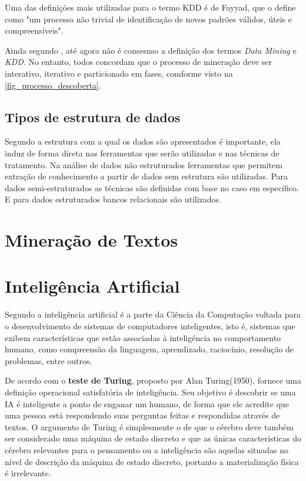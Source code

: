 \documentclass[
	12pt,				%
	openright,			%
	twoside,			%
	a4paper,			%
	english,			%
	french,				%
	spanish,			%
	brazil				%
	]{abntex2}
\begin{document}
Uma das definições mais utilizadas para o termo KDD é de Fayyad, que o define como "um processo não trivial de identificação de novos padrões válidos, úteis e compreensíveis".\cite[p.3]{camilo2009mineraccao}

Ainda segundo , até agora não é consesnso a definição dos termos \emph{Data Mining} e \emph{KDD}. No entanto, todos concordam que o processo de mineração deve ser interativo, iterativo e particionado em fases, comforme visto na \autoref{fig_processo_descoberta}. 

\subsection{Tipos de estrutura de dados}
Segundo  a estrutura com a qual os dados são apresentados é importante, ela induz de forma direta nas ferramentas que serão utilizadas e nas técnicas de tratamento. Na análise de dados  não estruturados ferramentas que permitem extração de conhecimento a partir de dados sem estrutura são utilizadas. Para dados semi-estruturados as técnicas são definidas  com base no caso em específico. E para dados estruturados bancos relacionais são utilizados.


\section{Mineração de Textos}

\section{Inteligência Artificial}
Segundo  a inteligência artificial é a parte da Ciência da Computação voltada para o desenvolvimento de sistemas de computadores inteligentes, isto é, sistemas que exibem características que estão associadas à inteligência no comportamento humano, como compreensão da linguagem, aprendizado, raciocínio, resolução de problemas, entre outros.

De acordo com  o \textbf{teste de Turing}, proposto por Alan Turing(1950), fornece uma definição operacional satisfatória de inteligência. Seu objetivo é descobrir se uma IA é inteligente a ponto de enganar um humano, de forma que ele acredite que uma pessoa está respondendo suas perguntas feitas e respondidas através de textos. O argumento de Turing é simplesmente o de que o cérebro deve também ser considerado uma máquina de estado discreto e que as únicas características do cérebro relevantes para o pensamento ou a inteligência são aquelas situadas no nível de descrição da máquina de estado discreto, portanto a materialização física é irrelevante.
\end{document}
